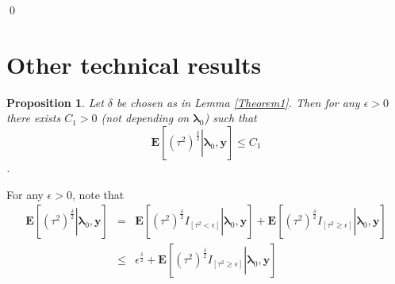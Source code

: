 \documentclass[noinfoline,11pt]{imsart}
\numberwithin{equation}{section}
\theoremstyle{plain}
\newtheorem{prop}{Proposition}[section]
\newcommand{\y}{\mathbf{y}}
\newcommand{\bl}{\boldsymbol{\lambda}}
\newcommand{\E}{\boldsymbol{E}}
\begin{document}
\qed

\section{Other technical results} \label{Appendix B}

\begin{prop}\label{upperboundontau^2}
Let $\delta$ be chosen as in Lemma \ref{Theorem1}. Then for any 
$\epsilon>0$ there exists $C_1>0$ (not depending on $\bl_0$) such that  $$
\E\left[\left.\left(\tau^2\right)^{\frac{\delta}{2}}\right|\bl_0,\y\right]
\leq C_1 
$$.
\end{prop}

\proof For any $\epsilon > 0$, note that 
\begin{eqnarray}\label{upperboundtau^2:1}
 \E\left[\left.\left(\tau^2\right)^{\frac{\delta}{2}}\right| \bl_0,\y\right]&=&\E\left[\left.\left(\tau^2\right)^{\frac{\delta}{2}}I_{\left[\tau^2<\epsilon\right]}\right| \bl_0,\y\right]+\E\left[\left.\left(\tau^2\right)^{\frac{\delta}{2}}I_{\left[\tau^2\geq\epsilon\right]}\right| \bl_0,\y\right]\nonumber \\
&\leq & \epsilon^{\frac{\delta}{2}}+\E\left[\left.\left(\tau^2\right)^{\frac{\delta}{2}}I_{\left[\tau^2\geq\epsilon\right]}\right| \bl_0,\y\right] 
\end{eqnarray}
\end{document}
